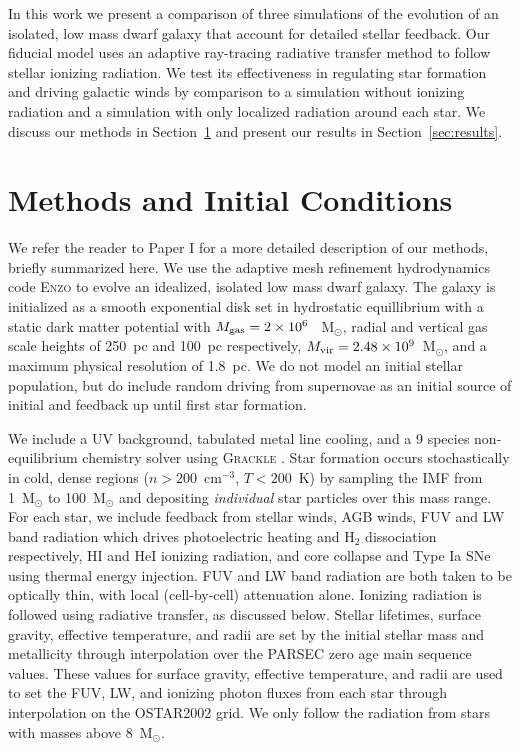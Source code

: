 \documentclass[twocolumn]{aastex62}
\begin{document}
In this work we present a comparison of three simulations of the evolution of an isolated, low mass dwarf galaxy that account for detailed stellar feedback. Our fiducial model uses an adaptive ray-tracing radiative transfer method to follow stellar ionizing radiation. We test its effectiveness in regulating star formation and driving galactic winds by comparison to a simulation without ionizing radiation and a simulation with only localized radiation around each star. We discuss our methods in Section~\ref{sec:methods} and present our results in Section~\ref{sec:results}.

\section{Methods and Initial Conditions} \label{sec:methods}
We refer the reader to Paper I for a more detailed description of our methods, briefly summarized here. We use the adaptive mesh refinement hydrodynamics code \textsc{Enzo} \citep{Enzo2014} to evolve an idealized, isolated low mass dwarf galaxy. The galaxy is initialized as a smooth exponential disk set in hydrostatic equillibrium with a static dark matter potential \citep{Burkert1995} with $M_{\rm gas} = 2 \times 10^6~$~M$_{\odot}$, radial and vertical gas scale heights of 250~pc and 100~pc respectively, $M_{\rm vir} = 2.48 \times 10^9$~M$_{\odot}$, and a maximum physical resolution of 1.8~pc. We do not model an initial stellar population, but do include random driving from supernovae as an initial source of initial and feedback up until first star formation.

We include a UV background, tabulated metal line cooling, and a 9 species non-equilibrium chemistry solver using \textsc{Grackle} \citep{GrackleMethod}. Star formation occurs stochastically in cold, dense regions ($n > 200$~cm$^{-3}$, $T < 200$~K) by sampling the \cite{Salpeter1955} IMF from 1~M$_{\odot}$ to 100~M$_{\odot}$ and depositing \textit{individual} star particles over this mass range. For each star, we include feedback from stellar winds, AGB winds, FUV and LW band radiation which drives photoelectric heating and H$_2$ dissociation respectively, HI and HeI ionizing radiation, and core collapse and Type Ia SNe using thermal energy injection. FUV and LW band radiation are both taken to be optically thin, with local (cell-by-cell) attenuation alone. Ionizing radiation is followed using radiative transfer, as discussed below. Stellar lifetimes, surface gravity, effective temperature, and radii are set by the initial stellar mass and metallicity through interpolation over the PARSEC \citep{Bressan2012} zero age main sequence values. These values for surface gravity, effective temperature, and radii are used to set the FUV, LW, and ionizing photon fluxes from each star through interpolation on the OSTAR2002 \citep{LanzHubeny2003} grid. We only follow the radiation from stars with masses above 8~M$_{\odot}$. 
\end{document}
